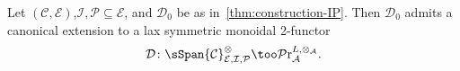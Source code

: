 \medskip



\begin{thm}
  Let $(\mathcal C,\mathcal E)$,$\mathcal I,\mathcal P\subseteq\mathcal E$, and $\mathcal D_0$ be as in~\cref{thm:construction-IP}. Then $\mathcal D_0$ admits a canonical extension to a lax symmetric monoidal 2-functor
  \[
    \mathcal D\colon\sSpan{\mathcal C}_{\mathcal E,\mathcal I,\mathcal P}^{\otimes}\too\mathcal P\mathrm r_{\mathcal A}^{L,\otimes_{\mathcal A}}.
  \]
\end{thm}


